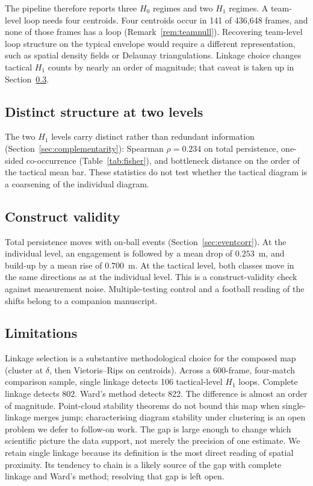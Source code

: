 The pipeline therefore reports three $H_0$ regimes and two $H_1$
regimes. A team-level loop needs four centroids. Four centroids occur in
141 of 436{,}648 frames, and none of those frames has a loop
(Remark~\ref{rem:teamnull}). Recovering
team-level loop structure on the typical envelope would require a
different representation, such as spatial density fields or Delaunay
triangulations. Linkage choice changes tactical $H_1$ counts by nearly
an order of magnitude; that caveat is taken up in
Section~\ref{sec:limitations}.

\subsection{Distinct structure at two levels}
\label{sec:disc-distinct}

The two $H_1$ levels carry distinct rather than redundant
information (Section~\ref{sec:complementarity}): Spearman
$\rho=0.234$ on total persistence, one-sided co-occurrence
(Table~\ref{tab:fisher}), and bottleneck distance on the order of
the tactical mean bar. These statistics do not test whether the
tactical diagram is a coarsening of the individual diagram.

\subsection{Construct validity}
\label{sec:disc-validity}

Total persistence moves with on-ball events
(Section~\ref{sec:eventcorr}). At the individual level, an engagement
is followed by a mean drop of $0.253$~m, and build-up by a mean rise
of $0.700$~m. At the tactical level, both classes move in the same
directions as at the individual level. This is a construct-validity check against measurement
noise. Multiple-testing control and a football reading of the shifts
belong to a companion manuscript.

\subsection{Limitations}
\label{sec:limitations}

Linkage selection is a substantive methodological choice for the
composed map (cluster at $\delta$, then Vietoris--Rips on centroids).
Across a 600-frame, four-match comparison sample, single linkage
detects 106 tactical-level $H_1$ loops. Complete linkage detects 802.
Ward's method detects 822. The difference is almost an order of
magnitude. Point-cloud stability theorems do not bound this map when
single-linkage merges jump; characterising diagram stability under
clustering is an open problem we defer to follow-on work. The gap is
large enough to change which scientific picture the data support, not
merely the precision of one estimate. We retain single linkage because
its definition is the most direct reading of spatial proximity. Its
tendency to chain is a likely source of the gap with complete linkage
and Ward's method; resolving that gap is left open.


